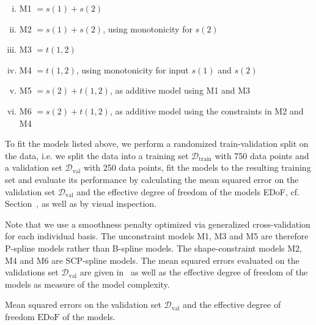 \begin{enumerate}[(i)]
	\item M1 $= s(1) + s(2)$
	\item M2 $= s(1) + s(2)$, using monotonicity for $s(2)$
	\item M3 $= t(1,2)$
	\item M4 $= t(1,2)$, using monotonicity for input $s(1)$ and $s(2)$
	\item M5 $= s(2) + t(1,2)$, as additive model using M1 and M3
	\item M6 $= s(2) + t(1,2)$, as additive model using the constraints in M2 and M4
\end{enumerate}
%
To fit the models listed above, we perform a randomized train-validation split on the data, i.e. we split the data into a training set $\mathcal{D}_{\text{train}}$ with 750 data points and a validation set $\mathcal{D}_{\text{val}}$ with 250 data points, fit the models to the resulting training set and evaluate its performance by calculating the mean squared error on the validation set $\mathcal{D}_{\text{val}}$ and the effective degree of freedom of the models EDoF, cf. Section~, as well as by visual inspection.

Note that we use a smoothness penalty optimized via generalized cross-validation for each individual basis. The unconstraint models M1, M3 and M5 are therefore P-spline models rather than B-spline models. The shape-constraint models M2, M4 and M6 are SCP-spline models. The mean squared errors evaluated on the validations set $\mathcal{D}_{\text{val}}$ are given in~ as well as the effective degree of freedom of the models as measure of the model complexity. 

\begin{table}[H]
	\begin{center}
	\end{center}
	\caption{Mean squared errors on the validation set $\mathcal{D}_{\text{val}}$ and the effective degree of freedom $\text{EDoF}$ of the models.}
	\label{tab:bosch-mse-val}
\end{table}

